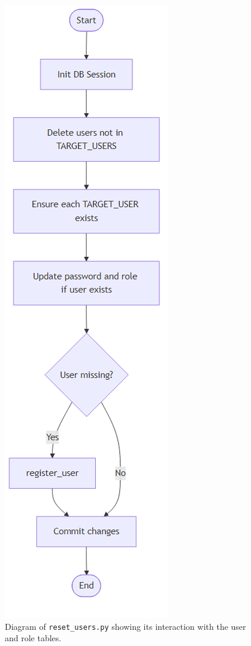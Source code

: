 \documentclass{report}
\begin{document}
\begin{figure}[h]
    \centering
    \includegraphics[width=\textwidth,height=0.8\textheight,keepaspectratio]{png_files/reset_users_flow.png}
    \caption{Diagram of \texttt{reset\_users.py} showing its interaction with the user and role tables.}
\end{figure}
\end{document}
